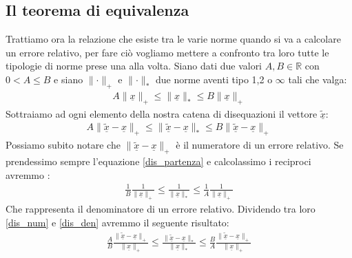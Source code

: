 \documentclass[12pt, a4paper]{book}
\theoremstyle{definition}
\newcommand{\VarMtrx}[1]{\ensuremath{\underline{#1}}}
\begin{document}
\subsection{Il teorema di equivalenza}
\begin{flushleft}
Trattiamo ora la relazione che esiste tra le varie norme quando si va a calcolare un errore relativo, per fare ciò vogliamo mettere a confronto tra loro tutte le tipologie di norme prese una alla volta. 
Siano dati due valori $A,B \in \mathbb{R}$ con $0<A \leq B$ e siano $\lVert \cdot \rVert_{+}$ e $\lVert \cdot \rVert_{*}$ due norme aventi tipo 1,2 o $\infty$ tali che valga: 
\begin{equation} \label{dis_partenza}
	\begin{split}
		A\lVert\VarMtrx{x}\rVert_{+} \leq \lVert\VarMtrx{x}\rVert_{*} \leq B\lVert\VarMtrx{x}\rVert_{+}
	\end{split}
\end{equation}
Sottraiamo ad ogni elemento della nostra catena di disequazioni il vettore $\widetilde{\VarMtrx{x}}$: 
\begin{equation} \label{dis_num}
	\begin{split}
		A\lVert\widetilde{\VarMtrx{x}} - \VarMtrx{x}\rVert_{+} \leq \lVert\widetilde{\VarMtrx{x}} - \VarMtrx{x}\rVert_{*} \leq B\lVert\widetilde{\VarMtrx{x}} - \VarMtrx{x}\rVert_{+}
	\end{split}
\end{equation}
Possiamo subito notare che $\lVert\widetilde{\VarMtrx{x}} - \VarMtrx{x}\rVert_{+}$ è il numeratore di un errore relativo.  Se prendessimo sempre l'equazione  \ref{dis_partenza} e calcolassimo i reciproci avremmo :
\begin{equation} \label{dis_den}
	\begin{split}
		\frac{1}{B}\frac{1}{\lVert\VarMtrx{x}\rVert_{+} }\leq \frac{1}{\lVert\VarMtrx{x}\rVert_{*}} \leq \frac{1}{A}\frac{1}{\lVert\VarMtrx{x}\rVert_{+} }
	\end{split}
\end{equation}
Che rappresenta il denominatore di un errore relativo.
Dividendo tra loro \ref{dis_num} e \ref{dis_den} avremmo il seguente risultato:
\begin{equation} \label{dis_err_rel}
	\begin{split}
		\frac{A}{B}\frac{\lVert\widetilde{\VarMtrx{x}} - \VarMtrx{x}\rVert_{+}}{\lVert\VarMtrx{x}\rVert_{+} }\leq \frac{\lVert\widetilde{\VarMtrx{x}} - \VarMtrx{x}\rVert_{*}}{\lVert\VarMtrx{x}\rVert_{*}} \leq \frac{B}{A}\frac{\lVert\widetilde{\VarMtrx{x}} - \VarMtrx{x}\rVert_{+}}{\lVert\VarMtrx{x}\rVert_{+} }

\end{split}
\end{equation}
\end{flushleft}
\end{document}
